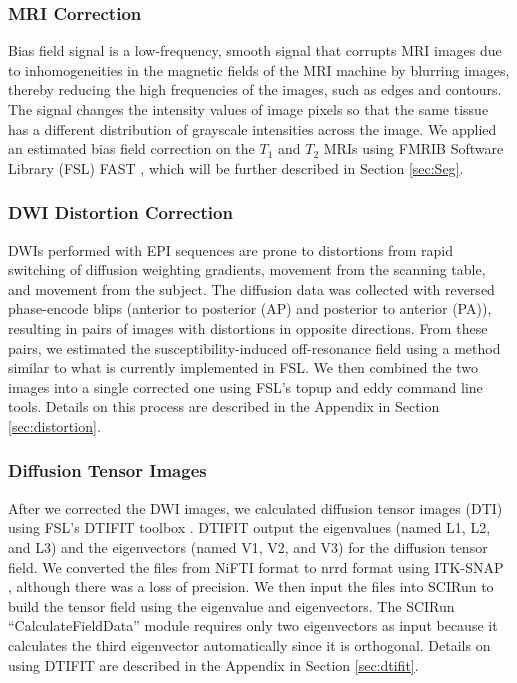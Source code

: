 \subsubsection{MRI Correction}

Bias field signal is a low-frequency, smooth signal that corrupts MRI images due to inhomogeneities in the magnetic fields of the MRI machine by blurring images, thereby reducing the high frequencies of the images, such as edges and contours. The signal changes the intensity values of image pixels so that the same tissue has a different distribution of grayscale intensities across the image. \cite{ref:bias} We applied an estimated bias field correction on the $T_1$ and $T_2$ MRIs using FMRIB Software Library (FSL) FAST \cite{ref:fslfast}, which will be further described in Section \ref{sec:Seg}.

\subsubsection{DWI Distortion Correction}

DWIs performed with EPI sequences are prone to distortions from rapid switching of diffusion weighting gradients, movement from the scanning table, and movement from the subject. The diffusion data was collected with reversed phase-encode blips (anterior to posterior (AP) and posterior to anterior (PA)), resulting in pairs of images with distortions in opposite directions. From these pairs, we estimated the susceptibility-induced off-resonance field using a method \cite{ref:fsltopup1} similar to what is currently implemented in FSL.\cite{ref:fsltopup2} We then combined the two images into a single corrected one using FSL's topup and eddy command line tools. Details on this process are described in the Appendix in Section \ref{sec:distortion}.

\subsubsection{Diffusion Tensor Images}

After we corrected the DWI images, we calculated diffusion tensor images (DTI) using FSL's DTIFIT toolbox \cite{ref:dtifit}. DTIFIT output the eigenvalues (named L1, L2, and L3) and the eigenvectors (named V1, V2, and V3) for the diffusion tensor field. We converted the files from NiFTI format to nrrd format using ITK-SNAP \cite{ref:itksnap}, although there was a loss of precision. We then input the files into SCIRun to build the tensor field using the eigenvalue and eigenvectors. The SCIRun ``CalculateFieldData'' module requires only two eigenvectors as input because it calculates the third eigenvector automatically since it is orthogonal. Details on using DTIFIT are described in the Appendix in Section \ref{sec:dtifit}.

